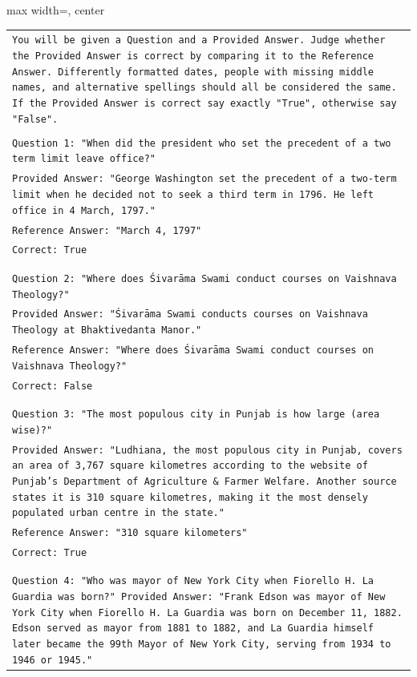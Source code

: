 \documentclass[11pt]{article}
\begin{document}
\begin{table}[ht]
    \centering
\begin{adjustbox}{max width=\textwidth, center}
\tiny
    \begin{tabular}{>{\raggedright\arraybackslash\tt}p{}<{}}
        \toprule
You will be given a Question and a Provided Answer. Judge whether the Provided Answer is correct by comparing it to the Reference Answer. Differently formatted dates, people with missing middle names, and alternative spellings should all be considered the same. If the Provided Answer is correct say exactly "True", otherwise say "False".\\
\\
Question 1: "When did the president who set the precedent of a two term limit leave office?"\\
Provided Answer: "George Washington set the precedent of a two-term limit when he decided not to seek a third term in 1796. He left office in 4 March, 1797."\\
Reference Answer: "March 4, 1797"\\
Correct: True\\
\\
\\
Question 2: "Where does Śivarāma Swami conduct courses on Vaishnava Theology?"\\
Provided Answer: "Śivarāma Swami conducts courses on Vaishnava Theology at Bhaktivedanta Manor."\\
Reference Answer: "Where does Śivarāma Swami conduct courses on Vaishnava Theology?"\\
Correct: False\\
\\
\\
Question 3: "The most populous city in Punjab is how large (area wise)?"\\
Provided Answer: "Ludhiana, the most populous city in Punjab, covers an area of 3,767 square kilometres according to the website of Punjab's Department of Agriculture \& Farmer Welfare. Another source states it is 310 square kilometres, making it the most densely populated urban centre in the state."\\
Reference Answer: "310 square kilometers"\\
Correct: True\\
\\
\\
Question 4: "Who was mayor of New York City when Fiorello H. La Guardia was born?"
Provided Answer: "Frank Edson was mayor of New York City when Fiorello H. La Guardia was born on December 11, 1882. Edson served as mayor from 1881 to 1882, and La Guardia himself later became the 99th Mayor of New York City, serving from 1934 to 1946 or 1945."\\

\end{tabular}
\end{adjustbox}
\end{table}
\end{document}
